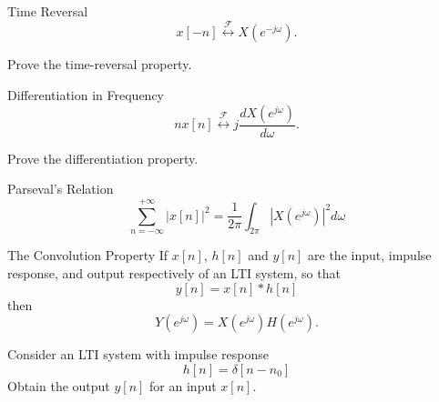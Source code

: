 \begin{frame}{Time Reversal}
    \begin{equation*}
        x[-n] \overset{\mathcal{F}}{\leftrightarrow} X(e^{-j\omega}).
    \end{equation*}
    \begin{example}
        Prove the time-reversal property.
    \end{example}
\end{frame}

\begin{frame}{Differentiation in Frequency}
    \begin{equation*}
        nx[n] \overset{\mathcal{F}}{\leftrightarrow} j \frac{d X(e^{j\omega})}{d\omega}.
    \end{equation*}
    \begin{example}
        Prove the differentiation property.
    \end{example}
\end{frame}

\begin{frame}{Parseval's Relation}
    \begin{equation*}
        \sum_{n=-\infty}^{+\infty}|x[n]|^2 = \frac{1}{2\pi}\int_{2\pi} | X(e^{j\omega})|^2d\omega
    \end{equation*}
\end{frame}

\begin{frame}{The Convolution Property}
    If $x[n]$, $h[n]$ and $y[n]$ are the input, impulse response, and output respectively of an LTI system, so that
    \begin{equation*}
        y[n] = x[n]\ast h[n]
    \end{equation*}
    then
    \begin{equation*}
        Y(e^{j\omega}) = X(e^{j\omega})H(e^{j\omega}).
    \end{equation*}

    \begin{example}
        Consider an LTI system with impulse response
        \begin{equation*}
          h[n] = \delta[n-n_0]
        \end{equation*}
        Obtain the output $y[n]$ for an input $x[n]$.
    \end{example}
\end{frame}


